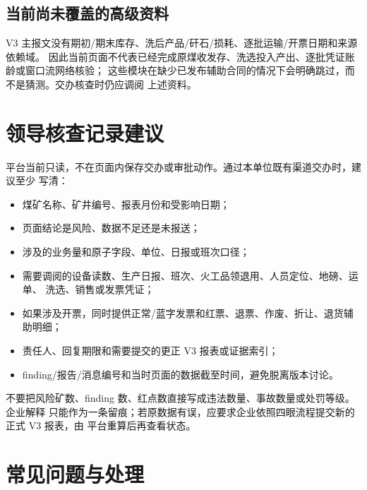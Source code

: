 \documentclass[UTF8,openany,zihao=-4,fontset=none]{ctexbook}
\begin{document}
\section{当前尚未覆盖的高级资料}

V3 主报文没有期初/期末库存、洗后产品/矸石/损耗、逐批运输/开票日期和来源依赖域。
因此当前页面不代表已经完成原煤收发存、洗选投入产出、逐批凭证账龄或窗口流网络核验；
这些模块在缺少已发布辅助合同的情况下会明确跳过，而不是猜测。交办核查时仍应调阅
上述资料。

\chapter{领导核查记录建议}

平台当前只读，不在页面内保存交办或审批动作。通过本单位既有渠道交办时，建议至少
写清：

\begin{itemize}
  \item 煤矿名称、矿井编号、报表月份和受影响日期；
  \item 页面结论是风险、数据不足还是未报送；
  \item 涉及的业务量和原子字段、单位、日报或班次口径；
  \item 需要调阅的设备读数、生产日报、班次、火工品领退用、人员定位、地磅、运单、
  洗选、销售或发票凭证；
  \item 如果涉及开票，同时提供正常/蓝字发票和红票、退票、作废、折让、退货辅助明细；
  \item 责任人、回复期限和需要提交的更正 V3 报表或证据索引；
  \item finding/报告/消息编号和当时页面的数据截至时间，避免脱离版本讨论。
\end{itemize}

\begin{warningbox}
不要把风险矿数、finding 数、红点数直接写成违法数量、事故数量或处罚等级。企业解释
只能作为一条留痕；若原数据有误，应要求企业依照四眼流程提交新的正式 V3 报表，由
平台重算后再查看状态。
\end{warningbox}

\chapter{常见问题与处理}
\end{document}
